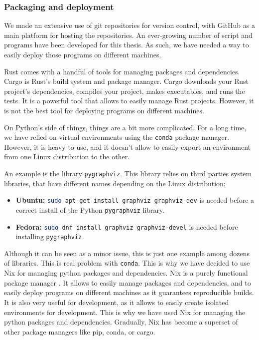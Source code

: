     \subsubsection{Packaging and deployment}
    We made an extensive use of git repositories for version control, with GitHub as a main platform for hosting the repositories. An ever-growing number of script and programs have been developed for this thesis. As such, we have needed a way to easily deploy those programs on different machines.

    Rust comes with a handful of tools for managing packages and dependencies. Cargo is Rust's build system and package manager. Cargo downloads your Rust project's dependencies, compiles your project, makes executables, and runs the tests. It is a powerful tool that allows to easily manage Rust projects. However, it is not the best tool for deploying programs on different machines. 

    On Python's side of things, things are a bit more complicated. For a long time, we have relied on virtual environments using the \texttt{conda} package manager. However, it is heavy to use, and it doesn't allow to easily export an environment from one Linux distribution to the other. 

    An example is the library \texttt{pygraphviz}. This library relies on third parties system libraries, that have different names depending on the Linux distribution:
    
    \begin{itemize}
        \item \textbf{Ubuntu:} \lstinline[language=bash]|sudo apt-get install graphviz graphviz-dev| is needed before a correct install of the Python \texttt{pygraphviz} library. 
        \item \textbf{Fedora:} \lstinline[language=bash]|sudo dnf install graphviz graphviz-devel| is needed before installing \texttt{pygraphviz}
    \end{itemize}

    Although it can be seen as a minor issue, this is just one example among dozens of libraries. This is real problem with \texttt{conda}. This is why we have decided to use Nix for managing python packages and dependencies. Nix is a purely functional package manager \cite{NixOriginalThesis06}. It allows to easily manage packages and dependencies, and to easily deploy programs on different machines as it guarantees reproducible builds. It is also very useful for development, as it allows to easily create isolated environments for development. This is why we have used Nix for managing the python packages and dependencies. Gradually, Nix has become a superset of other package managers like pip, conda, or cargo. 
    

